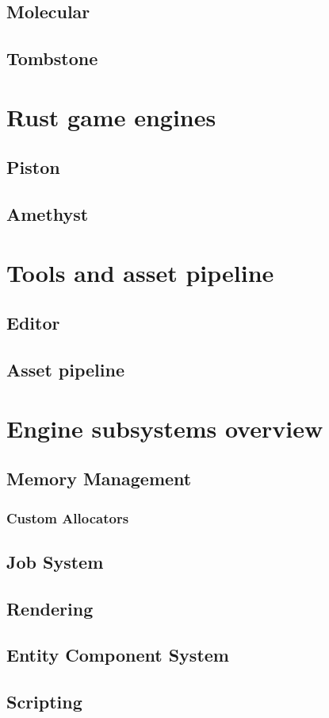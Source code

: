 \subsection{Molecular}
\blindtext
\subsection{Tombstone}
\blindtext
\section{Rust game engines}
\blindtext
\subsection{Piston}
\blindtext
\subsection{Amethyst}
\blindtext
\section{Tools and asset pipeline}
\blindtext
\subsection{Editor}
\blindtext
\subsection{Asset pipeline}
\blindtext
\section{Engine subsystems overview}
\blindtext
\subsection{Memory Management}
\blindtext
\subsubsection{Custom Allocators}
\blindtext
\subsection{Job System}
\blindtext
\subsection{Rendering}
\blindtext
\subsection{Entity Component System}
\blindtext
\subsection{Scripting}
\blindtext